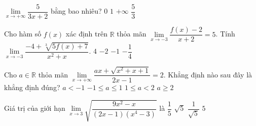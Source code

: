 \begin{ex}%
	$\lim\limits_{x\to+\infty}\dfrac{5}{3x+2}$ bằng  bao nhiêu?
	 \choice
		{\True $0$} 
		{$1$} 
		 {$+\infty$}
		 {$\dfrac{5}{3}$}
\end{ex}

\begin{ex}%
	Cho hàm số $f(x)$ xác định trên  $\mathbb{R}$ thỏa mãn $\lim\limits_{x\to -3}\dfrac{f(x)-2}{x+2}=5$. Tính $\lim\limits_{x\to -3}\dfrac{-4+\sqrt[3]{5f(x)+7}}{x^2+x}$.
	\choice 
		{$4$} 
		 {$-2$}
		{\True  $-1$}
		 {$-\dfrac{1}{4}$}
\end{ex}

\begin{ex}%
	Cho $a\in \mathbb{R}$ thỏa mãn $\lim\limits_{x\to +\infty}\dfrac{ax+\sqrt{x^2+x+1}}{2x-1}=2$.  Khẳng định nào sau đây là khẳng định đúng?
	 \choice
		 {$a<-1$}
		{$-1\le a\le  1$}
		{$1\le  a<2$}
		 {\True $a\ge 2$}
\end{ex}

\begin{ex}%
	Giá trị của  giới hạn $\lim\limits_{x\to 3}\sqrt{\dfrac{9x^2-x}{(2x-1)(x^4-3)}}$ là
	\choice 
		{$\dfrac{1}{5}$} 
		 {$\sqrt{5}$}
		{\True  $\dfrac{1}{\sqrt{5}}$}
		 {$5$}
\end{ex}

